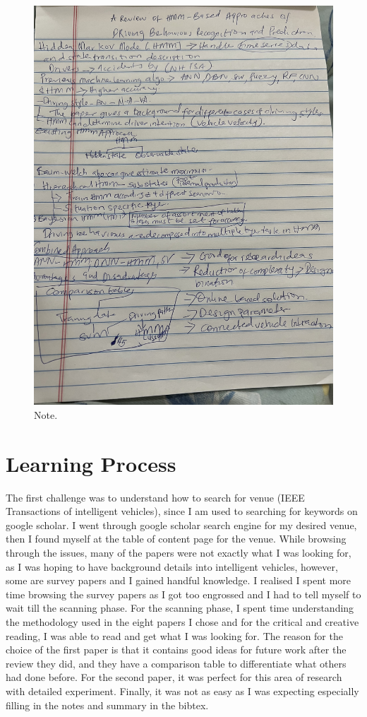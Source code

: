 \documentclass{article}
\begin{document}
\begin{figure}[htbp]
  \centering
  \includegraphics[width=1.2\textwidth,angle= 270]{IMG-8414.jpg}
  \caption{Note.}
  \label{fig:review}
  \end{figure}
\section{Learning Process}
The first challenge was to understand how to search for venue (IEEE Transactions of intelligent vehicles), since I am used to searching for keywords on google scholar. I went through google scholar search engine for my desired venue, then I found myself at the table of content page for the venue. While browsing through the issues, many of the papers were not exactly what I was looking for, as I was hoping to have background details into intelligent vehicles, however, some are survey papers and I gained handful knowledge. I realised I spent more time browsing the survey papers as I got too engrossed and I had to tell myself to wait till the scanning phase. For the scanning phase, I spent time understanding the methodology used in the eight papers I chose and for the critical and creative reading, I was able to read and get what I was looking for. The reason for the choice of the first paper is that it contains good ideas for future work after the review they did, and they have a comparison table to differentiate what others had done before. For the second paper, it was perfect for this area of research with detailed experiment.
Finally, it was not as easy as I was expecting especially filling in the notes and summary in the bibtex.
\end{document}
